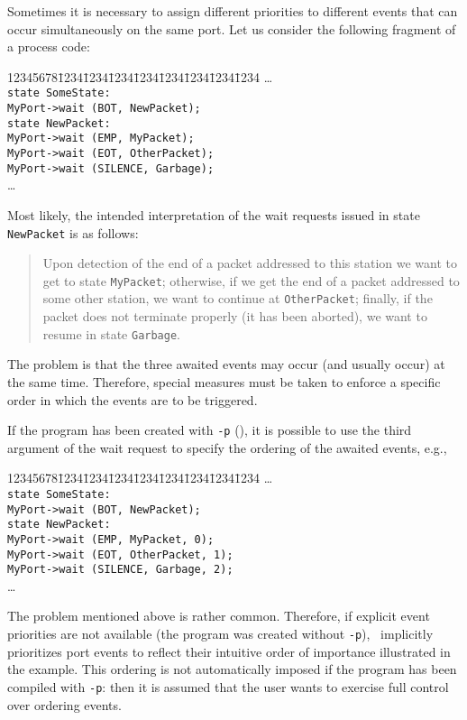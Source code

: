Sometimes it is necessary to assign different priorities to different
events that can occur simultaneously on the same port.
Let us consider the following fragment of a process code:
{\tt\begin{tabbing}
12345678\=1234\=1234\=1234\=1234\=1234\=1234\=1234\=1234\kill
\> \ldots \\
\> {\tt state SomeState:}\\
\> \> {\tt MyPort->wait (BOT, NewPacket);}\\
\> {\tt state NewPacket:}\\
\> \> {\tt MyPort->wait (EMP, MyPacket);}\\
\> \> {\tt MyPort->wait (EOT, OtherPacket);}\\
\> \> {\tt MyPort->wait (SILENCE, Garbage);}\\
\> \ldots
\end{tabbing}}
Most likely, the intended interpretation of the wait requests issued
in state {\tt NewPacket} is as follows:

\begin{quote}
Upon detection of the end
of a packet addressed to this station we want to get to state
{\tt MyPacket}; otherwise, if we get the end of a packet addressed
to some other station, we want to continue at {\tt OtherPacket}; finally,
if the packet does not terminate properly (it has been aborted),
we want to resume in state {\tt Garbage}.
\end{quote}

The problem is that the three awaited events may occur (and
usually occur) at the same time.
Therefore, special measures must be taken to enforce a specific order in which
the events are to be triggered.

If the program has been created with 
{\tt -p} (), it
is possible to use the third argument of the wait request
to specify the ordering of the awaited events, e.g.,
{\tt\begin{tabbing}
12345678\=1234\=1234\=1234\=1234\=1234\=1234\=1234\=1234\kill
\> \ldots \\
\> {\tt state SomeState:}\\
\> \> {\tt MyPort->wait (BOT, NewPacket);}\\
\> {\tt state NewPacket:}\\
\> \> {\tt MyPort->wait (EMP, MyPacket, 0);}\\
\> \> {\tt MyPort->wait (EOT, OtherPacket, 1);}\\
\> \> {\tt MyPort->wait (SILENCE, Garbage, 2);}\\
\> \ldots
\end{tabbing}}
The problem mentioned above is rather common.
Therefore, if explicit event priorities are not available (the program
was created without {\tt -p}), \smurph\ implicitly prioritizes
port events
to reflect their intuitive order of importance illustrated in the example.
This ordering is not automatically imposed
if the program has been compiled with
{\tt -p}: then it is assumed that the user wants to exercise full control
over ordering events.

